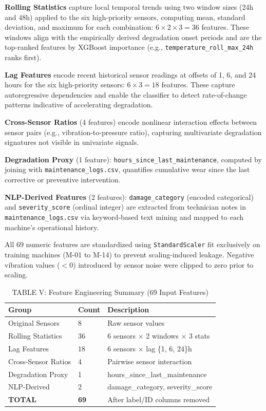 \documentclass[conference]{IEEEtran}
\begin{document}
\textbf{Rolling Statistics} capture local temporal trends using two window sizes (24h and 48h) applied to the six high-priority sensors, computing mean, standard deviation, and maximum for each combination: $6 \times 2 \times 3 = 36$ features. These windows align with the empirically derived degradation onset periods and are the top-ranked features by XGBoost importance (e.g., \texttt{temperature\_roll\_max\_24h} ranks first).

\textbf{Lag Features} encode recent historical sensor readings at offsets of 1, 6, and 24 hours for the six high-priority sensors: $6 \times 3 = 18$ features. These capture autoregressive dependencies and enable the classifier to detect rate-of-change patterns indicative of accelerating degradation.

\textbf{Cross-Sensor Ratios} (4 features) encode nonlinear interaction effects between sensor pairs (e.g., vibration-to-pressure ratio), capturing multivariate degradation signatures not visible in univariate signals.

\textbf{Degradation Proxy} (1 feature): \texttt{hours\_since\_last\_maintenance}, computed by joining with \texttt{maintenance\_logs.csv}, quantifies cumulative wear since the last corrective or preventive intervention.

\textbf{NLP-Derived Features} (2 features): \texttt{damage\_category} (encoded categorical) and \texttt{severity\_score} (ordinal integer) are extracted from technician notes in \texttt{maintenance\_logs.csv} via keyword-based text mining and mapped to each machine's operational history.

All 69 numeric features are standardized using \texttt{StandardScaler} fit exclusively on training machines (M-01 to M-14) to prevent scaling-induced leakage. Negative vibration values ($<0$) introduced by sensor noise were clipped to zero prior to scaling.

\begin{table}[htbp]
\caption{TABLE V: Feature Engineering Summary (69 Input Features)}
\centering
\begin{tabular}{lll}
\hline
\textbf{Group} & \textbf{Count} & \textbf{Description} \\
\hline
Original Sensors & 8 & Raw sensor values \\
Rolling Statistics & 36 & 6 sensors $\times$ 2 windows $\times$ 3 stats \\
Lag Features & 18 & 6 sensors $\times$ lag \{1, 6, 24\}h \\
Cross-Sensor Ratios & 4 & Pairwise sensor interaction \\
Degradation Proxy & 1 & hours\_since\_last\_maintenance \\
NLP-Derived & 2 & damage\_category, severity\_score \\
\hline
\textbf{TOTAL} & \textbf{69} & After label/ID columns removed \\
\hline
\end{tabular}
\label{tab:features}
\end{table}
\end{document}

